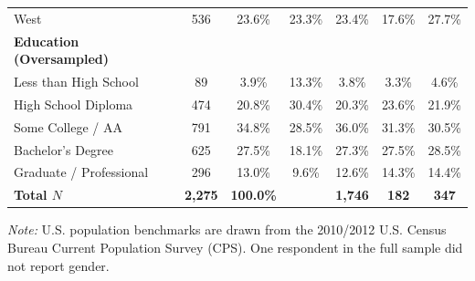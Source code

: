 \documentclass[12pt, letterpaper]{article}
\begin{document}
\begin{table}[ht!]
\begin{tabular*}{\linewidth}{@{\extracolsep{\fill}}lcccccc@{}}
\quad West & 536 & 23.6\% & 23.3\% & 23.4\% & 17.6\% & 27.7\% \\
\addlinespace[3pt]
\textbf{Education (Oversampled)} & & & & & & \\
\quad Less than High School & 89 & 3.9\% & 13.3\% & 3.8\% & 3.3\% & 4.6\% \\
\quad High School Diploma & 474 & 20.8\% & 30.4\% & 20.3\% & 23.6\% & 21.9\% \\
\quad Some College / AA & 791 & 34.8\% & 28.5\% & 36.0\% & 31.3\% & 30.5\% \\
\quad Bachelor's Degree & 625 & 27.5\% & 18.1\% & 27.3\% & 27.5\% & 28.5\% \\
\quad Graduate / Professional & 296 & 13.0\% & 9.6\% & 12.6\% & 14.3\% & 14.4\% \\
\midrule
\textbf{Total $N$} & \textbf{2,275} & \textbf{100.0\%} & & \textbf{1,746} & \textbf{182} & \textbf{347} \\
\bottomrule
\end{tabular*}
\begin{minipage}{\linewidth}
\vspace{4pt}
\footnotesize
\textit{Note:} U.S. population benchmarks are drawn from the 2010/2012 U.S. Census Bureau Current Population Survey (CPS). One respondent in the full sample did not report gender.
\end{minipage}
\end{table}




\end{document}
